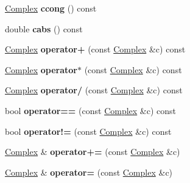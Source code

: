\begin{DoxyCompactItemize}
\item 
\hypertarget{class_complex_aa3762ead143efcbf7730cb8237a32064}{\hyperlink{class_complex}{Complex} {\bfseries ccong} () const }\label{class_complex_aa3762ead143efcbf7730cb8237a32064}

\item 
\hypertarget{class_complex_ad5940f42fe76847ab91923cecc778f11}{double {\bfseries cabs} () const }\label{class_complex_ad5940f42fe76847ab91923cecc778f11}

\item 
\hypertarget{class_complex_a85335af4619e9e47aa9c0846d1d149b0}{\hyperlink{class_complex}{Complex} {\bfseries operator+} (const \hyperlink{class_complex}{Complex} \&c) const }\label{class_complex_a85335af4619e9e47aa9c0846d1d149b0}

\item 
\hypertarget{class_complex_a86f4398baa4ea8b9b52c39ad66f0a763}{\hyperlink{class_complex}{Complex} {\bfseries operator$\ast$} (const \hyperlink{class_complex}{Complex} \&c) const }\label{class_complex_a86f4398baa4ea8b9b52c39ad66f0a763}

\item 
\hypertarget{class_complex_a8a4d2bf57c76d1eed742b6385ffce365}{\hyperlink{class_complex}{Complex} {\bfseries operator/} (const \hyperlink{class_complex}{Complex} \&c) const }\label{class_complex_a8a4d2bf57c76d1eed742b6385ffce365}

\item 
\hypertarget{class_complex_acb07e7c316fc54ba67777ddc4881cc7e}{bool {\bfseries operator==} (const \hyperlink{class_complex}{Complex} \&c) const }\label{class_complex_acb07e7c316fc54ba67777ddc4881cc7e}

\item 
\hypertarget{class_complex_abeb903f280ad5c5283e363e7034d462f}{bool {\bfseries operator!=} (const \hyperlink{class_complex}{Complex} \&c) const }\label{class_complex_abeb903f280ad5c5283e363e7034d462f}

\item 
\hypertarget{class_complex_ae567e20c39745c1bfe8f07be126a5fff}{\hyperlink{class_complex}{Complex} \& {\bfseries operator+=} (const \hyperlink{class_complex}{Complex} \&c)}\label{class_complex_ae567e20c39745c1bfe8f07be126a5fff}

\item 
\hypertarget{class_complex_ad63f572bf5b643c714e388cda5c6f5cb}{\hyperlink{class_complex}{Complex} \& {\bfseries operator=} (const \hyperlink{class_complex}{Complex} \&c)}\label{class_complex_ad63f572bf5b643c714e388cda5c6f5cb}

\end{DoxyCompactItemize}
